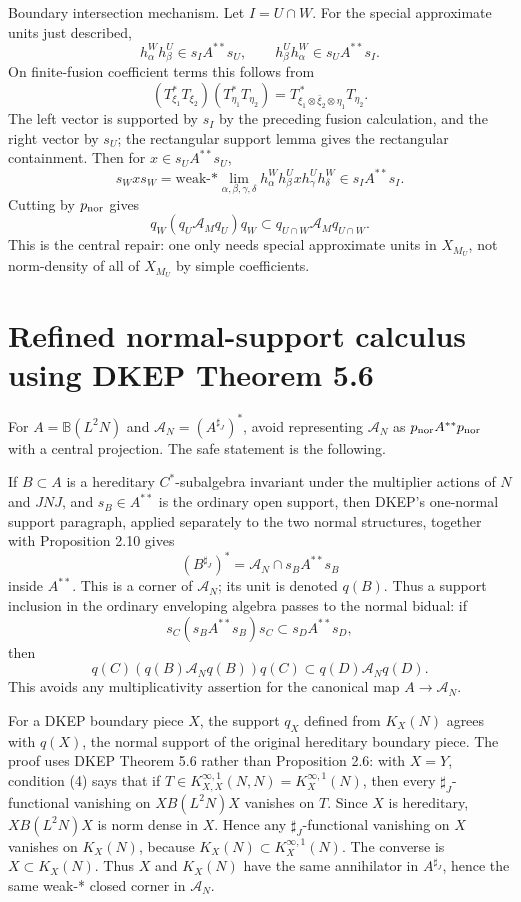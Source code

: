 \documentclass{article}
\begin{document}
Boundary intersection mechanism.  Let \(I=U\cap W\).  For the special
approximate units just described,
\[
        h_\alpha^W h_\beta^U\in s_I A^{**}s_U,\qquad
        h_\beta^U h_\alpha^W\in s_U A^{**}s_I.
\]
On finite-fusion coefficient terms this follows from
\[
 (T_{\xi_1}^*T_{\xi_2})(T_{\eta_1}^*T_{\eta_2})
 =T_{\xi_1\otimes\bar\xi_2\otimes\eta_1}^{\,*}T_{\eta_2}.
\]
The left vector is supported by \(s_I\) by the preceding fusion calculation,
and the right vector by \(s_U\); the rectangular support lemma gives the
rectangular containment.  Then for \(x\in s_UA^{**}s_U\),
\[
s_Wxs_W=\text{weak-*}\lim_{\alpha,\beta,\gamma,\delta}
 h_\alpha^W h_\beta^U x h_\gamma^U h_\delta^W\in s_IA^{**}s_I.
\]
Cutting by \(p_{\rm nor}\) gives
\[
        q_W(q_U\mathcal A_Mq_U)q_W
        \subset q_{U\cap W}\mathcal A_Mq_{U\cap W}.
\]
This is the central repair: one only needs special approximate units in
\(X_{M_U}\), not norm-density of all of \(X_{M_U}\) by simple coefficients.



\section*{Refined normal-support calculus using DKEP Theorem 5.6}

For \(A=\mathbb B(L^2N)\) and
\(\mathcal A_N=(A^{\sharp_J})^*\), avoid representing \(\mathcal A_N\) as
\(p_{\rm nor}A^{**}p_{\rm nor}\) with a central projection.  The safe statement
is the following.

If \(B\subset A\) is a hereditary \(C^*\)-subalgebra invariant under the
multiplier actions of \(N\) and \(JNJ\), and \(s_B\in A^{**}\) is the ordinary
open support, then DKEP's one-normal support paragraph, applied separately to
the two normal structures, together with Proposition 2.10 gives
\[
        (B^{\sharp_J})^*=\mathcal A_N\cap s_BA^{**}s_B
\]
inside \(A^{**}\).  This is a corner of \(\mathcal A_N\); its unit is denoted
\(q(B)\).  Thus a support inclusion in the ordinary enveloping algebra passes
to the normal bidual: if
\[
        s_C(s_BA^{**}s_B)s_C\subset s_DA^{**}s_D,
\]
then
\[
        q(C)(q(B)\mathcal A_Nq(B))q(C)\subset q(D)\mathcal A_Nq(D).
\]
This avoids any multiplicativity assertion for the canonical map
\(A\to\mathcal A_N\).

For a DKEP boundary piece \(X\), the support \(q_X\) defined from
\(K_X(N)\) agrees with \(q(X)\), the normal support of the original hereditary
boundary piece.  The proof uses DKEP Theorem 5.6 rather than Proposition 2.6:
with \(X=Y\), condition (4) says that if
\(T\in K_{X,X}^{\infty,1}(N,N)=K_X^{\infty,1}(N)\), then every
\(\sharp_J\)-functional vanishing on \(XB(L^2N)X\) vanishes on \(T\).  Since
\(X\) is hereditary, \(XB(L^2N)X\) is norm dense in \(X\).  Hence any
\(\sharp_J\)-functional vanishing on \(X\) vanishes on \(K_X(N)\), because
\(K_X(N)\subset K_X^{\infty,1}(N)\).  The converse is \(X\subset K_X(N)\).
Thus \(X\) and \(K_X(N)\) have the same annihilator in \(A^{\sharp_J}\), hence
the same weak-* closed corner in \(\mathcal A_N\).
\end{document}
